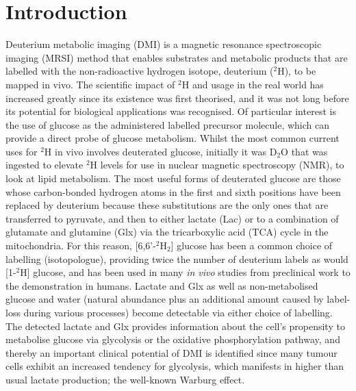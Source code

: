 \documentclass[class=article, crop=false]{standalone}
\begin{document}
 
\label{section:Glucose}

\section{Introduction}

Deuterium metabolic imaging (DMI) is a magnetic resonance spectroscopic imaging (MRSI) method that enables substrates and metabolic products that are labelled with the non-radioactive hydrogen isotope, deuterium ($^2$H), to be mapped in vivo. The scientific impact of $^2$H and usage in the real world has increased greatly since its existence was first theorised\cite{Urey1932AConcentration}, and it was not long before its potential for biological applications was recognised\cite{Schoenheimer1935DeuteriumMetabolism, Schoenheimer1938TheMetabolism}. Of particular interest is the use of glucose as the administered labelled precursor molecule, which can provide a direct probe of glucose metabolism. Whilst the most common current uses for $^2$H in vivo involves deuterated glucose, initially it was D$_2$O that was ingested to elevate $^2$H levels for use in nuclear magnetic spectroscopy (NMR)\cite{Brereton1986PreliminarySpectroscopy, Irving1987InSpectroscopy}, to look at lipid metabolism. The most useful forms of deuterated glucose are those whose carbon-bonded hydrogen atoms in the first and sixth positions have been replaced by deuterium because these substitutions are the only ones that are transferred to pyruvate, and then to either lactate (Lac) or to a combination of glutamate and glutamine (Glx) via the tricarboxylic acid (TCA) cycle in the mitochondria. For this reason, [6,6'-$^2$H$_2$] glucose has been a common choice of labelling (isotopologue), providing twice the number of deuterium labels as would [1-$^2$H] glucose, and has been used in many \textit{in vivo} studies from preclinical work\cite{Lu2017QuantitativeSpectroscopy, Meerwaldt2023InImaging} to the demonstration in humans\cite{DeFeyter2018DeuteriumVivo, Roig2022Deuterium7T}. Lactate and Glx as well as non-metabolised glucose and water (natural abundance plus an additional amount caused by label-loss during various processes) become detectable via either choice of labelling. The detected lactate and Glx provides information about the cell’s propensity to metabolise glucose via glycolysis or the oxidative phosphorylation pathway, and thereby an important clinical potential of DMI is identified since many tumour cells exhibit an increased tendency for glycolysis, which manifests in higher than usual lactate production;  the well-known Warburg effect\cite{Warburg1956OnCells}.    
\end{document}
